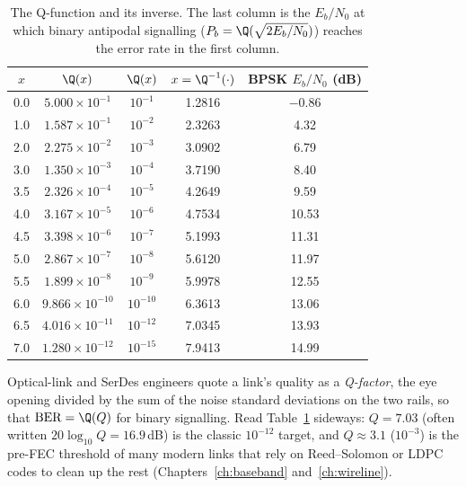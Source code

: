 
\begin{table}[htbp]\centering\small
\caption{The Q-function and its inverse. The last column is the $E_b/N_0$ at which binary
antipodal signalling ($P_b=\Q(\sqrt{2E_b/N_0})$) reaches the error rate in the first column.}\label{tab:appA:qvalues}
\begin{tabular}{@{}cc@{\qquad}ccc@{}}
\toprule
$x$ & $\Q(x)$ & $\Q(x)$ & $x=\Q^{-1}(\cdot)$ & BPSK $E_b/N_0$ (dB)\\
\midrule
0.0 & $5.000\times10^{-1}$ & $10^{-1}$ & 1.2816 & $-0.86$\\
1.0 & $1.587\times10^{-1}$ & $10^{-2}$ & 2.3263 & 4.32\\
2.0 & $2.275\times10^{-2}$ & $10^{-3}$ & 3.0902 & 6.79\\
3.0 & $1.350\times10^{-3}$ & $10^{-4}$ & 3.7190 & 8.40\\
3.5 & $2.326\times10^{-4}$ & $10^{-5}$ & 4.2649 & 9.59\\
4.0 & $3.167\times10^{-5}$ & $10^{-6}$ & 4.7534 & 10.53\\
4.5 & $3.398\times10^{-6}$ & $10^{-7}$ & 5.1993 & 11.31\\
5.0 & $2.867\times10^{-7}$ & $10^{-8}$ & 5.6120 & 11.97\\
5.5 & $1.899\times10^{-8}$ & $10^{-9}$ & 5.9978 & 12.55\\
6.0 & $9.866\times10^{-10}$ & $10^{-10}$ & 6.3613 & 13.06\\
6.5 & $4.016\times10^{-11}$ & $10^{-12}$ & 7.0345 & 13.93\\
7.0 & $1.280\times10^{-12}$ & $10^{-15}$ & 7.9413 & 14.99\\
\bottomrule
\end{tabular}
\end{table}

\begin{inpractice}
Optical-link and SerDes engineers quote a link's quality as a \emph{Q-factor}, the eye opening
divided by the sum of the noise standard deviations on the two rails, so that $\text{BER}=\Q(Q)$
for binary signalling. Read Table~\ref{tab:appA:qvalues} sideways: $Q=7.03$ (often written
$20\log_{10}Q=16.9$\,dB) is the classic $10^{-12}$ target, and $Q\approx3.1$ ($10^{-3}$) is the
pre-FEC threshold of many modern links that rely on Reed--Solomon or LDPC codes to clean up the
rest (Chapters~\ref{ch:baseband} and~\ref{ch:wireline}).
\end{inpractice}

